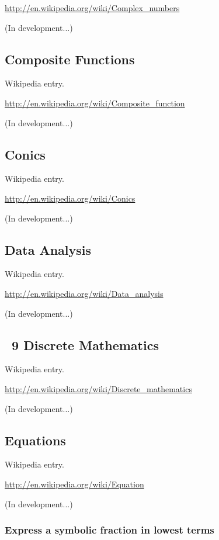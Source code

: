 \documentclass[12pt,twoside]{book}
\begin{document}
\href{http://en.wikipedia.org/wiki/Complex_numbers}{http://en.wikipedia.org/wiki/Complex\_numbers}

(In development...)

\subsection[Composite Functions]{Composite Functions}
Wikipedia entry.

\href{http://en.wikipedia.org/wiki/Composite_function}{http://en.wikipedia.org/wiki/Composite\_function}

(In development...)

\subsection[Conics]{Conics}
Wikipedia entry.

\href{http://en.wikipedia.org/wiki/Conics}{http://en.wikipedia.org/wiki/Conics}

(In development...)

\subsection[Data Analysis]{Data Analysis}
Wikipedia entry.

\href{http://en.wikipedia.org/wiki/Data_analysis}{http://en.wikipedia.org/wiki/Data\_analysis}

(In development...)

\subsection[\ 9 Discrete Mathematics ]{\ 9 Discrete Mathematics }
Wikipedia entry.

\href{http://en.wikipedia.org/wiki/Discrete_mathematics}{http://en.wikipedia.org/wiki/Discrete\_mathematics}

(In development...)

\subsection[Equations]{Equations}
Wikipedia entry.

\href{http://en.wikipedia.org/wiki/Equation}{http://en.wikipedia.org/wiki/Equation}

(In development...)

\subsubsection[Express a symbolic fraction in lowest
terms]{Express a symbolic fraction in lowest terms}
{\textquotedbl}{\textquotedbl}{\textquotedbl}
\end{document}
